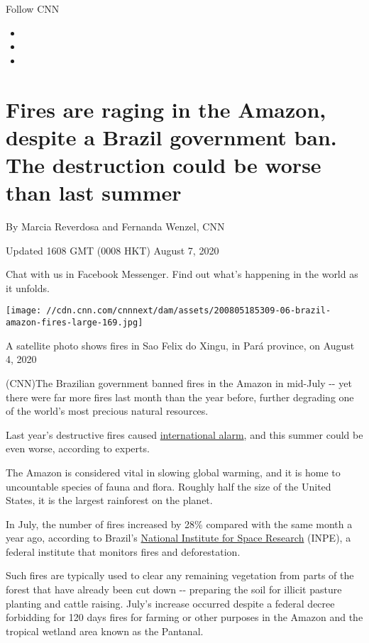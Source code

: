 Follow CNN

\begin{itemize}
\item
\item
\item
\end{itemize}

\hypertarget{fires-are-raging-in-the-amazon-despite-a-brazil-government-ban-the-destruction-could-be-worse-than-last-summer}{%
\section{Fires are raging in the Amazon, despite a Brazil government
ban. The destruction could be worse than last
summer}\label{fires-are-raging-in-the-amazon-despite-a-brazil-government-ban-the-destruction-could-be-worse-than-last-summer}}

By Marcia Reverdosa and Fernanda Wenzel, CNN

Updated 1608 GMT (0008 HKT) August 7, 2020

Chat with us in Facebook Messenger. Find out what's happening in the
world as it unfolds.

\texttt{[image: //cdn.cnn.com/cnnnext/dam/assets/200805185309-06-brazil-amazon-fires-large-169.jpg]}

A satellite photo shows fires in Sao Felix do Xingu, in Pará province,
on August 4, 2020

(CNN)The Brazilian government banned fires in the Amazon in mid-July
-\/- yet there were far more fires last month than the year before,
further degrading one of the world's most precious natural resources.

Last year's destructive fires caused
\href{https://www.cnn.com/2019/08/22/us/iyw-how-to-help-amazon-forest-fires-trnd/index.html}{international
alarm}, and this summer could be even worse, according to experts.

The Amazon is considered vital in slowing global warming, and it is home
to uncountable species of fauna and flora. Roughly half the size of the
United States, it is the largest rainforest on the planet.

In July, the number of fires increased by 28\% compared with the same
month a year ago, according to Brazil's
\href{http://www.inpe.br/}{National Institute for Space Research}
(INPE), a federal institute that monitors fires and deforestation.

Such fires are typically used to clear any remaining vegetation from
parts of the forest that have already been cut down -\/- preparing the
soil for illicit pasture planting and cattle raising. July's increase
occurred despite a federal decree forbidding for 120 days fires for
farming or other purposes in the Amazon and the tropical wetland area
known as the Pantanal.

